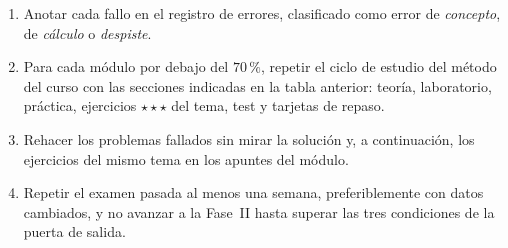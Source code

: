\begin{enumerate}[label=\arabic*.]
  \item Anotar cada fallo en el registro de errores, clasificado como error de \emph{concepto}, de \emph{cálculo} o \emph{despiste}.
  \item Para cada módulo por debajo del $70\,\%$, repetir el ciclo de estudio del método del curso con las secciones indicadas en la tabla anterior: teoría, laboratorio, práctica, ejercicios $\star\star\star$ del tema, test y tarjetas de repaso.
  \item Rehacer los problemas fallados sin mirar la solución y, a continuación, los ejercicios del mismo tema en los apuntes del módulo.
  \item Repetir el examen pasada al menos una semana, preferiblemente con datos cambiados, y no avanzar a la Fase~II hasta superar las tres condiciones de la puerta de salida.
\end{enumerate}
